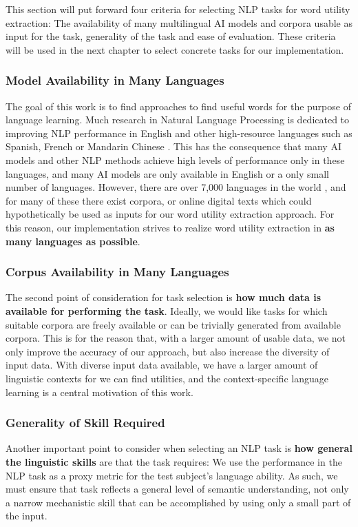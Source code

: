 This section will put forward four criteria for selecting NLP tasks for word utility extraction:
The availability of many multilingual AI models and corpora usable as input for the task, generality of the task and ease of evaluation.
These criteria will be used in the next chapter to select concrete tasks for our implementation.

\subsubsection{Model Availability in Many Languages}
The goal of this work is to find approaches to find useful words for the purpose of language learning.
Much research in Natural Language Processing is dedicated to improving NLP performance in English and other high-resource languages such as Spanish, French or Mandarin Chinese .
This has the consequence that many AI models and other NLP methods achieve high levels of performance only in these languages, and many AI models are only available in English or a only small number of languages.
However, there are over 7,000 languages in the world , and for many of these there exist corpora, or online digital texts which could hypothetically be used as inputs for our word utility extraction approach.
For this reason, our implementation strives to realize word utility extraction in \textbf{as many languages as possible}.

\subsubsection{Corpus Availability in Many Languages}
The second point of consideration for task selection is \textbf{how much data is available for performing the task}.
Ideally, we would like tasks for which suitable corpora are freely available or can be trivially generated from available corpora.
This is for the reason that, with a larger amount of usable data, we not only improve the accuracy of our approach, but also increase the diversity of input data.
With diverse input data available, we have a larger amount of linguistic contexts for we can find utilities, and the context-specific language learning is a central motivation of this work.

\subsubsection{Generality of Skill Required}
Another important point to consider when selecting an NLP task is \textbf{how general the linguistic skills} are that the task requires:
We use the performance in the NLP task as a proxy metric for the test subject's language ability.
As such, we must ensure that task reflects a general level of semantic understanding, not only a narrow mechanistic skill that can be accomplished by using only a small part of the input.

